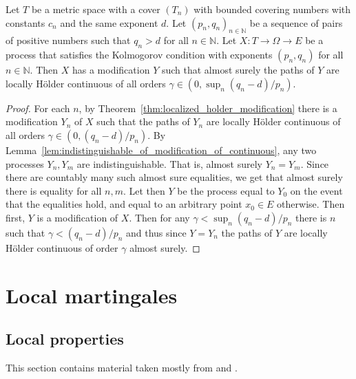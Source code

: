 \begin{theorem}\label{thm:localized_holder_modification_sup}
  \leanok
Let $T$ be a metric space with a cover $(T_n)$ with bounded covering numbers with constants $c_n$ and the same exponent $d$.
Let $(p_n, q_n)_{n \in \mathbb{N}}$ be a sequence of pairs of positive numbers such that $q_n > d$ for all $n \in \mathbb{N}$.
Let $X : T \to \Omega \to E$ be a process that satisfies the Kolmogorov condition with exponents $(p_n, q_n)$ for all $n \in \mathbb{N}$.
Then $X$ has a modification $Y$ such that almost surely the paths of $Y$ are locally Hölder continuous of all orders $\gamma \in (0, \sup_n (q_n - d)/p_n)$.
\end{theorem}

\begin{proof}\leanok
For each $n$, by Theorem~\ref{thm:localized_holder_modification} there is a modification $Y_n$ of $X$ such that the paths of $Y_n$ are locally Hölder continuous of all orders $\gamma \in (0, (q_n - d)/p_n)$.
By Lemma~\ref{lem:indistinguishable_of_modification_of_continuous}, any two processes $Y_n, Y_m$ are indistinguishable.
That is, almost surely $Y_n = Y_m$.
Since there are countably many such almost sure equalities, we get that almost surely there is equality for all $n, m$.
Let then $Y$ be the process equal to $Y_0$ on the event that the equalities hold, and equal to an arbitrary point $x_0 \in E$ otherwise.
Then first, $Y$ is a modification of $X$.
Then for any $\gamma < \sup_n (q_n - d)/p_n$ there is $n$ such that $\gamma < (q_n - d)/p_n$ and thus since $Y = Y_n$ the paths of $Y$ are locally Hölder continuous of order $\gamma$ almost surely.
\end{proof}


\chapter{Local martingales}

\section{Local properties}

This section contains material taken mostly from \cite[Chapters 10 and 18]{kallenberg2021} and \cite{almostsuremath}.


